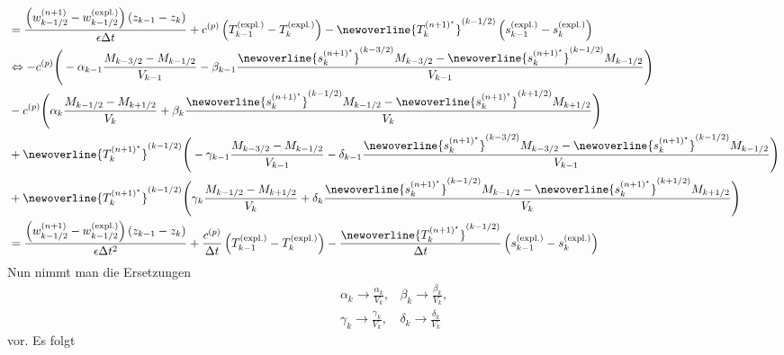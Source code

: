 \begin{align}
&= \frac{\left(w_{k - 1/2}^{(n + 1)} - w_{k - 1/2}^{(\text{expl.})}\right)\left(z_{k - 1} - z_k\right)}{\epsilon\Delta t} + c^{(p)}\left(T^{(\text{expl.})}_{k - 1} - T^{(\text{expl.})}_{k}\right) - \newoverline{T_k^{(n + 1)^\star}}^{(k - 1/2)}\left(s^{(\text{expl.})}_{k - 1} - s^{(\text{expl.})}_k\right)\nonumber\\
&\Leftrightarrow-c^{(p)}\Bigg(-\alpha_{k - 1}\frac{M_{k - 3/2} - M_{k - 1/2}}{V_{k - 1}} - \beta_{k - 1}\frac{\newoverline{s_k^{(n + 1)^\star}}^{(k - 3/2)}M_{k - 3/2} - \newoverline{s_k^{(n + 1)^\star}}^{(k - 1/2)}M_{k - 1/2}}{V_{k - 1}}\Bigg)\nonumber\\
&-c^{(p)}\Bigg(\alpha_k\frac{M_{k - 1/2} - M_{k + 1/2}}{V_k} + \beta_k\frac{\newoverline{s_k^{(n + 1)^\star}}^{(k - 1/2)}M_{k - 1/2} - \newoverline{s_k^{(n + 1)^\star}}^{(k + 1/2)}M_{k + 1/2}}{V_k}\Bigg)\nonumber\\
&+ \newoverline{T_k^{(n + 1)^\star}}^{(k - 1/2)}\Bigg(-\gamma_{k - 1}\frac{M_{k - 3/2} - M_{k - 1/2}}{V_{k - 1}} - \delta_{k - 1}\frac{\newoverline{s_k^{(n + 1)^\star}}^{(k - 3/2)}M_{k - 3/2} - \newoverline{s_k^{(n + 1)^\star}}^{(k - 1/2)}M_{k - 1/2}}{V_{k - 1}}\Bigg)\nonumber\\
&+ \newoverline{T_k^{(n + 1)^\star}}^{(k - 1/2)}\Bigg(\gamma_k\frac{M_{k - 1/2} - M_{k + 1/2}}{V_k} + \delta_k\frac{\newoverline{s_k^{(n + 1)^\star}}^{(k - 1/2)}M_{k - 1/2} - \newoverline{s_k^{(n + 1)^\star}}^{(k + 1/2)}M_{k + 1/2}}{V_k}\Bigg)\nonumber\\
&= \frac{\left(w_{k - 1/2}^{(n + 1)} - w_{k - 1/2}^{(\text{expl.})}\right)\left(z_{k - 1} - z_k\right)}{\epsilon\Delta t^2} + \frac{c^{(p)}}{\Delta t}\left(T^{(\text{expl.})}_{k - 1} - T^{(\text{expl.})}_{k}\right) - \frac{\newoverline{T_k^{(n + 1)^\star}}^{(k - 1/2)}}{\Delta t}\left(s^{(\text{expl.})}_{k - 1} - s^{(\text{expl.})}_k\right)
\end{align}
%
Nun nimmt man die Ersetzungen
%
\begin{align}
\alpha_k \to \frac{\alpha_k}{V_k},& \beta_k \to \frac{\beta_k}{V_k},\\
\gamma_k \to \frac{\gamma_k}{V_k},& \delta_k \to \frac{\delta_k}{V_k}
\end{align}
%
vor. Es folgt
%
